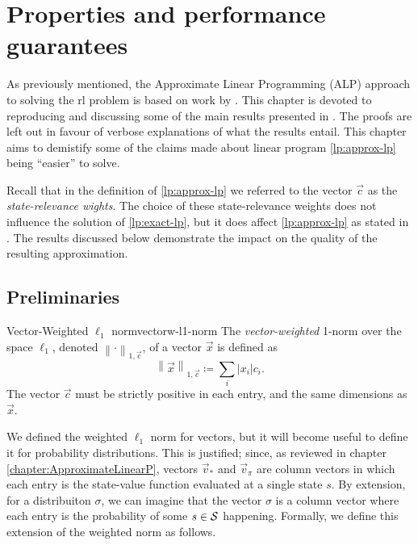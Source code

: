 \chapter{Properties and performance guarantees}
\label{chapter:PropertiesGuarantees}

As previously mentioned, the Approximate Linear Programming (ALP) approach to
solving the \ac{rl} problem is based on work by \citeauthor{farias2003LP2ADP}.
This chapter is devoted to reproducing and discussing some of the main results
presented in \cite{farias2003LP2ADP}. The proofs are left out in favour of
verbose explanations of what the results entail. This chapter aims to demistify
some of the claims made about linear program \eqref{lp:approx-lp} being
``easier'' to solve.

Recall that in the definition of \eqref{lp:approx-lp} we referred to the vector
$\vec{c}$ as the \emph{state-relevance wights}. The choice of these
state-relevance weights does not influence the solution of \eqref{lp:exact-lp},
but it does affect \eqref{lp:approx-lp} as stated in \cite{farias2003LP2ADP}.
The results discussed below demonstrate the impact on the quality of the
resulting approximation.

\section{Preliminaries}

\begin{dfn}{Vector-Weighted $\ell_1$ norm}{vectorw-l1-norm}
    The \emph{vector-weighted} 1-norm over the space $\ell_1$, denoted $\left\|
    \cdot \right\|_{1, \vec{c}}$, of a vector $\vec{x}$ is defined as
    \[
        \left\| \vec{x} \right\|_{1, \vec{c}} \coloneqq  \sum_i |x_i| c_i.
    \]
    The vector $\vec{c}$ must be strictly positive in each entry, and the same
    dimensions as $\vec{x}$.
\end{dfn}

We defined the weighted $\ell_1$ norm for vectors, but it will become useful to
define it for probability distributions. This is justified; since, as reviewed
in chapter \ref{chapter:ApproximateLinearP}, vectors $\vec{v}_*$ and
$\vec{v}_\pi$ are column vectors in which each entry is the state-value function
evaluated at a single state $s$. By extension, for a distribuiton $\sigma$, we
can imagine that the vector $\sigma$ is a column vector where each entry is the
probability of some $s \in \mathcal{S}$ happening. Formally, we define this
extension of the weighted norm as follows.

